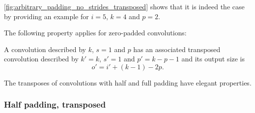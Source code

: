 \documentclass{article}
\begin{document}
\autoref{fig:arbitrary_padding_no_strides_transposed} shows that it is indeed
the case by providing an example for $i = 5$, $k = 4$ and $p = 2$.

The following property applies for zero-padded convolutions:

\begin{prop}\label{prop:arbitrary_padding_no_strides_transposed}
A convolution described by $k$, $s = 1$ and $p$ has an associated transposed
convolution described by $k' = k$, $s' = 1$ and $p' = k - p - 1$ and its output
size is
\begin{equation*}
    o' = i' + (k - 1) - 2p.
\end{equation*}
\end{prop}

The transposes of convolutions with half and full padding have elegant
properties.

\subsubsection{Half padding, transposed}
\end{document}
